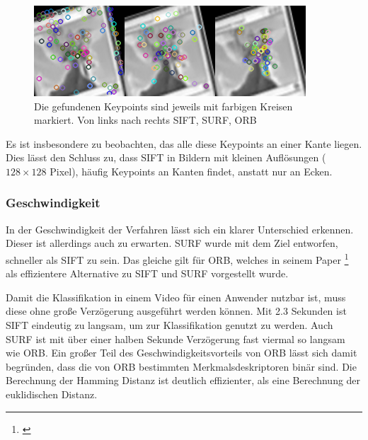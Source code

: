 \begin{figure}[h]
    \centering
		\includegraphics[scale=0.8]{bilder/keypointsRot.png}
    	\caption{Die gefundenen Keypoints sind jeweils mit farbigen Kreisen markiert. Von links nach rechts SIFT, SURF, ORB}
\label{fig:keypointsRot}
\end{figure}


Es ist insbesondere zu beobachten, das alle diese Keypoints an einer Kante liegen.
Dies lässt den Schluss zu, dass SIFT in Bildern mit kleinen Auflösungen ($128 \times 128$ Pixel), häufig Keypoints an Kanten findet, anstatt nur an Ecken.


\subsubsection{Geschwindigkeit}

In der Geschwindigkeit der Verfahren lässt sich ein klarer Unterschied erkennen. Dieser ist allerdings auch zu erwarten. SURF wurde mit dem Ziel entworfen, schneller als SIFT zu sein. Das gleiche gilt für ORB, welches in seinem Paper \footnote{\cite{Rublee:2011:OEA:2355573.2356268}} als effizientere Alternative zu SIFT und SURF vorgestellt wurde.

Damit die Klassifikation in einem Video für einen Anwender nutzbar ist, muss diese ohne große Verzögerung ausgeführt werden können. Mit 2.3 Sekunden ist SIFT eindeutig zu langsam, um zur Klassifikation genutzt zu werden. 
Auch SURF ist mit über einer halben Sekunde Verzögerung fast viermal so langsam wie ORB.
Ein großer Teil des Geschwindigkeitsvorteils von ORB lässt sich damit begründen, dass die von ORB bestimmten Merkmalsdeskriptoren binär sind. Die Berechnung der Hamming Distanz ist deutlich effizienter, als eine Berechnung der euklidischen Distanz.
